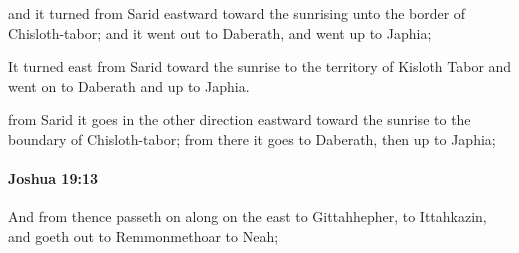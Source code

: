 			\begin{versebox}
					\item[BHS] 
					\item[ASV] and it turned from Sarid eastward toward the sunrising unto the border of Chisloth-tabor; and it went out to Daberath, and went up to Japhia;
					\item[NIV] It turned east from Sarid toward the sunrise to the territory of Kisloth Tabor and went on to Daberath and up to Japhia.
					\item[NRSV] from Sarid it goes in the other direction eastward toward the sunrise to the boundary of Chisloth-tabor; from there it goes to Daberath, then up to Japhia;
			\end{versebox}

		\paragraph{Joshua 19:13} %
			\label{JOSHUA-19-13}

			And from thence passeth on along on the east to Gittahhepher, to Ittahkazin, and goeth out to Remmonmethoar to Neah;

